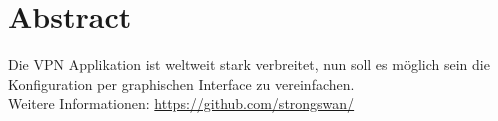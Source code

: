 \section{Abstract}
Die VPN Applikation ist weltweit stark verbreitet, nun soll es möglich sein die Konfiguration per graphischen Interface zu vereinfachen.\\


Weitere Informationen: \url{https://github.com/strongswan/}\\ \\ \\ \\


